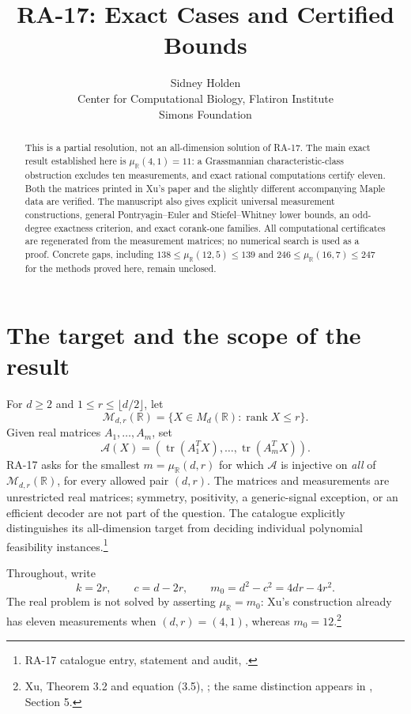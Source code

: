 \documentclass[11pt]{article}
\title{RA-17: Exact Cases and Certified Bounds}
\author{Sidney Holden\\{\small Center for Computational Biology, Flatiron Institute}\\{\small Simons Foundation}}
\date{}
\theoremstyle{definition}
\newcommand{\R}{\mathbb R}
\newcommand{\rank}{\operatorname{rank}}
\newcommand{\tr}{\operatorname{tr}}
\newcommand{\muR}{\mu_{\R}}
\begin{document}
\maketitle
\vspace{-1em}
\begin{abstract}
This is a partial resolution, not an all-dimension solution of RA-17. The main exact result established here is $\muR(4,1)=11$: a Grassmannian characteristic-class obstruction excludes ten measurements, and exact rational computations certify eleven. Both the matrices printed in Xu's paper and the slightly different accompanying Maple data are verified. The manuscript also gives explicit universal measurement constructions, general Pontryagin--Euler and Stiefel--Whitney lower bounds, an odd-degree exactness criterion, and exact corank-one families. All computational certificates are regenerated from the measurement matrices; no numerical search is used as a proof. Concrete gaps, including $138\leq\muR(12,5)\leq139$ and $246\leq\muR(16,7)\leq247$ for the methods proved here, remain unclosed.
\end{abstract}
\begingroup\small\setlength{\parskip}{0pt}\tableofcontents\endgroup
\newpage

\section{The target and the scope of the result}
For $d\geq2$ and $1\leq r\leq\lfloor d/2\rfloor$, let
\[
 \mathcal M_{d,r}(\R)=\{X\in M_d(\R):\rank X\leq r\}.
\]
Given real matrices $A_1,\ldots,A_m$, set
\[
 \mathcal A(X)=(\tr(A_1^TX),\ldots,\tr(A_m^TX)).
\]
RA-17 asks for the smallest $m=\muR(d,r)$ for which $\mathcal A$ is injective on \emph{all} of $\mathcal M_{d,r}(\R)$, for every allowed pair $(d,r)$. The matrices and measurements are unrestricted real matrices; symmetry, positivity, a generic-signal exception, or an efficient decoder are not part of the question. The catalogue explicitly distinguishes its all-dimension target from deciding individual polynomial feasibility instances.\footnote{RA-17 catalogue entry, statement and audit, \cite{catalogue}.}

Throughout, write
\begin{equation}\label{eq:parameters}
 k=2r,\qquad c=d-2r,\qquad m_0=d^2-c^2=4dr-4r^2.
\end{equation}
The real problem is not solved by asserting $\muR=m_0$: Xu's construction already has eleven measurements when $(d,r)=(4,1)$, whereas $m_0=12$.\footnote{Xu, Theorem 3.2 and equation (3.5), \cite{xu}; the same distinction appears in \cite{survey}, Section 5.}
\end{document}
